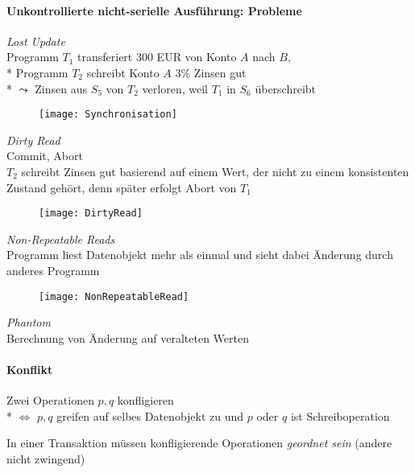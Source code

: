 \paragraph{Unkontrollierte nicht-serielle Ausführung: Probleme}
\begin{items}
	\item \emph{Lost Update}\\
		 Programm \( T_1 \) transferiert 300 EUR von Konto \( A \) nach \( B \),
		\\*
		Programm \( T_2 \) schreibt Konto \( A \) \( 3 \% \) Zinsen gut
		\\*
		\( \leadsto \) Zinsen aus \( S_5 \) von \( T_2 \) verloren, weil \( T_1 \) in \( S_6 \) überschreibt

	\begin{figure}[H]\centering\label{Synchronisation}\texttt{[image: Synchronisation]}\end{figure}
	
	\item \emph{Dirty Read}\\
		Commit, Abort \\
		\( T_2 \) schreibt Zinsen gut basierend auf einem Wert, der nicht zu einem konsistenten Zustand gehört, denn später erfolgt Abort von \( T_1 \)

	\begin{figure}[H]\centering\label{DirtyRead}\texttt{[image: DirtyRead]}\end{figure}
	
	\item \emph{Non-Repeatable Reads}\\
		 Programm liest Datenobjekt mehr als einmal und sieht dabei Änderung durch anderes Programm
	\begin{figure}[H]\centering\label{NonRepeatableRead}\texttt{[image: NonRepeatableRead]}\end{figure}
	
	\item \emph{Phantom}\\
		Berechnung von Änderung auf veralteten Werten
\end{items}

\paragraph{Konflikt}
\begin{items}
	\item Zwei Operationen \( p, q \) konfligieren
		\\*
		\( \Leftrightarrow \) \( p,q \) greifen auf selbes Datenobjekt zu und \( p \) oder \( q \) ist Schreiboperation
	\item In einer Transaktion müssen konfligierende Operationen \emph{geordnet sein} (andere nicht zwingend)
\end{items}

